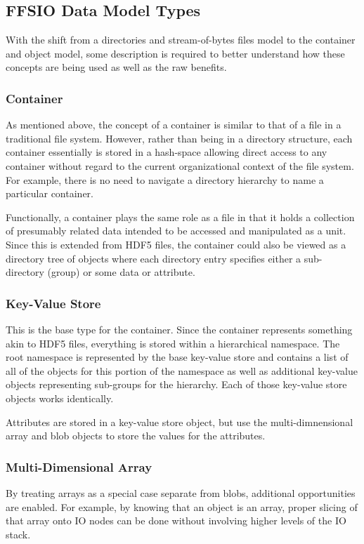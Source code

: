 \documentclass[conference]{IEEEtran}
\begin{document}
\subsection{FFSIO Data Model Types}
\label{sec:data-model}

With the shift from a directories and stream-of-bytes files model to the
container and object model, some description is required to better understand
how these concepts are being used as well as the raw benefits.

\subsubsection{Container}
As mentioned above, the concept of a container is similar to that of a file in
a traditional file system. However, rather than being in a directory structure,
each container essentially is stored in a hash-space allowing direct access to
any container without regard to the current organizational context of the
file system. For example, there is no need to navigate a directory hierarchy
to name a particular container.

Functionally, a container plays the same role as a file in that it holds a
collection of presumably related data intended to be accessed and manipulated
as a unit. Since this is extended from HDF5 files, the container could also be
viewed as a directory tree of objects where each directory entry specifies
either a sub-directory (group) or some data or attribute.

\subsubsection{Key-Value Store}
This is the base type for the container. Since the container represents
something akin to HDF5 files, everything is stored within a hierarchical
namespace. The root namespace is represented by the base key-value store and
contains a list of all of the objects for this portion of the namespace as well
as additional key-value objects representing sub-groups for the hierarchy. Each
of those key-value store objects works identically.

Attributes are stored in a key-value store object, but use the
multi-dimnensional array and blob objects to store the values for the
attributes.

\subsubsection{Multi-Dimensional Array}
By treating arrays as a special case separate from blobs, additional
opportunities are enabled. For example, by knowing that an object is an array,
proper slicing of that array onto IO nodes can be done without involving higher
levels of the IO stack.
\end{document}
